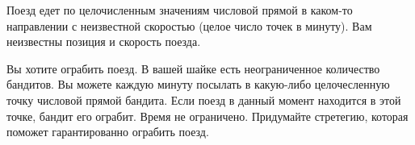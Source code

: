 \documentclass[12pt, a4paper, oneside]{article}
\begin{document}
\begin{problem}{5}
Поезд едет по целочисленным значениям числовой прямой в каком-то направлении с неизвестной скоростью (целое число точек в минуту). Вам неизвестны позиция и скорость поезда. 

Вы хотите ограбить поезд. В вашей шайке есть неограниченное количество бандитов. Вы можете каждую минуту посылать в какую-либо целочесленную точку числовой прямой бандита. Если поезд в данный момент находится в этой точке, бандит его ограбит. Время не ограничено. Придумайте стретегию, которая поможет гарантированно ограбить поезд. 
\end{problem}
\end{document}
